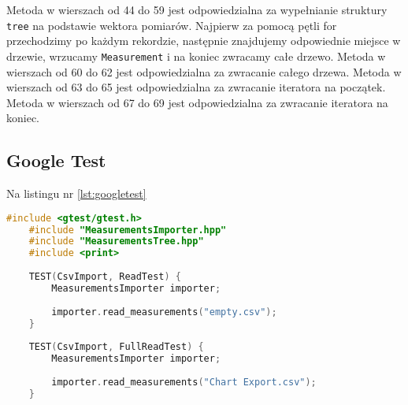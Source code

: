 Metoda w wierszach od 44 do 59 jest odpowiedzialna za wypełnianie struktury \texttt{tree} na podstawie wektora pomiarów. Najpierw za pomocą pętli for przechodzimy po każdym rekordzie, następnie znajdujemy odpowiednie miejsce w drzewie, wrzucamy \texttt{Measurement} i na koniec zwracamy całe drzewo.
Metoda w wierszach od 60 do 62 jest odpowiedzialna za zwracanie całego drzewa.
Metoda w wierszach od 63 do 65 jest odpowiedzialna za zwracanie iteratora na początek.
Metoda w wierszach od 67 do 69 jest odpowiedzialna za zwracanie iteratora na koniec.

\subsection{Google Test}
Na listingu nr \ref{lst:googletest}

\begin{lstlisting}[caption=Zawartość pliku \texttt{tests.cpp}, label={lst:googletest}, language=C++]
	#include <gtest/gtest.h>
	#include "MeasurementsImporter.hpp"
	#include "MeasurementsTree.hpp"
	#include <print>
	
	TEST(CsvImport, ReadTest) {
		MeasurementsImporter importer;
		
		importer.read_measurements("empty.csv");
	}
	
	TEST(CsvImport, FullReadTest) {
		MeasurementsImporter importer;
		
		importer.read_measurements("Chart Export.csv");
	}
	

\end{lstlisting}
